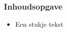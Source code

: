 \begin{frame}\frametitle{Inhoudsopgave}
    \begin{itemize}
        \item Een stukje tekst
    \end{itemize}
\end{frame}

